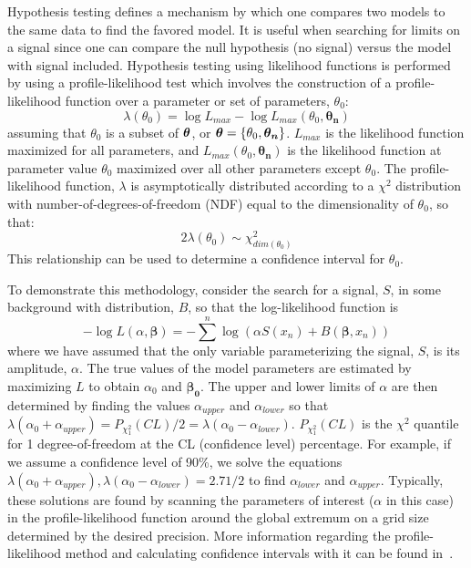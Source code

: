 Hypothesis testing defines a mechanism by which one compares two models to the same data to find the favored model.  It is useful when searching for limits on a signal since one can compare the null hypothesis (no signal) versus the model with signal included.  Hypothesis testing using likelihood functions is performed by using a profile-likelihood test which involves the construction of a profile-likelihood function over a parameter or set of parameters, $\theta_{0}$:
		\[
		\lambda(\theta_{0}) = \log L_{max}  - \log L_{max}(\theta_{0}, \boldsymbol{\theta_{n}})
		\]
assuming that $\theta_{0}$ is a subset of $\boldsymbol{\theta}$, or $\boldsymbol{\theta} = \{\theta_{0}, \boldsymbol{\theta_{n}}\}$.  $L_{max}$ is the likelihood function maximized for all parameters, and $ L_{max}(\theta_{0}, \boldsymbol{\theta_{n}})$ is the likelihood function at parameter value $\theta_{0}$ maximized over all other parameters except $\theta_{0}$.  The profile-likelihood function, $\lambda$ is asymptotically distributed according to a $\chi^{2}$ distribution with number-of-degrees-of-freedom (NDF) equal to the dimensionality of $\theta_{0}$, so that:
		\[
		2 \lambda (\theta_{0}) \sim \chi^{2}_{dim(\theta_{0})}
		\]
  This relationship can be used to determine a confidence interval for $\theta_{0}$.		

To demonstrate this methodology, consider the search for a signal, $S$, in some background with distribution, $B$, so that the log-likelihood function is
		\[
		-\log L (\alpha, \boldsymbol{\beta}) = -\sum^{n} \log (\alpha S (x_{n}) + B(\boldsymbol{\beta}, x_{n}))
		\]
where we have assumed that the only variable parameterizing the signal, $S$, is its amplitude, $\alpha$.  The true values of the model parameters are estimated by maximizing $L$ to obtain $\alpha_{0}$ and $\boldsymbol{\beta_{0}}$.  The upper and lower limits of $\alpha$ are then determined by finding the values $\alpha_{upper}$ and $\alpha_{lower}$ so that $\lambda(\alpha_{0} + \alpha_{upper}) =  P_{\chi^{2}_{1}} (CL)/2 = \lambda(\alpha_{0} - \alpha_{lower})$.  $P_{\chi^{2}_{1}} (CL)$ is the $\chi^{2}$ quantile for 1 degree-of-freedom at the CL (confidence level) percentage.  For example, if we assume a confidence level of 90\%, we solve the equations $\lambda(\alpha_{0} + \alpha_{upper}), \lambda(\alpha_{0} - \alpha_{lower}) = 2.71/2$ to find $\alpha_{lower}$ and $\alpha_{upper}$.  Typically, these solutions are found by scanning the parameters of interest  ($\alpha$ in this case) in the profile-likelihood function around the global extremum on a grid size determined by the desired precision.  More information regarding the profile-likelihood method and calculating confidence intervals with it can be found in~\cite{Venz1988}.

